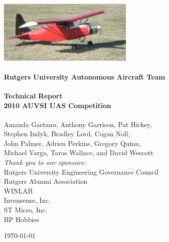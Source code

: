 \begin{titlepage}
\begin{center}

\includegraphics[width=0.5\textwidth]{../images/daedalus.jpg}\\[1cm]
\HRule \\[1cm]
{ \huge \bfseries Rutgers University Autonomous Aircraft Team } \\[0.5cm]
\HRule \\[0.5cm]
{ \large \bfseries Technical Report }
\\[0.5cm]
{ \large \bfseries 2010 AUVSI UAS Competition }
\\[0.5cm]
\HRule \\[1cm]

  {\large Amanda Gaetano, Anthony Garrison, Pat Hickey,}
\\{\large Stephen Indyk, Bradley Lord, Cogan Noll,}
\\{\large John Palmer, Adrien Perkins, Gregory Quinn,}
\\{\large Michael Varga, Taras Wallace, and David Wescott}
\\[1cm]
\emph{Thank you to our sponsors:}
\\ Rutgers University Engineering Governance Council
\\ Rutgers Alumni Association
\\ WINLAB
\\ Invensense, Inc.
\\ ST Micro, Inc.
\\ BP Hobbies

\vfill
{\large \today}

\end{center}
\end{titlepage}
